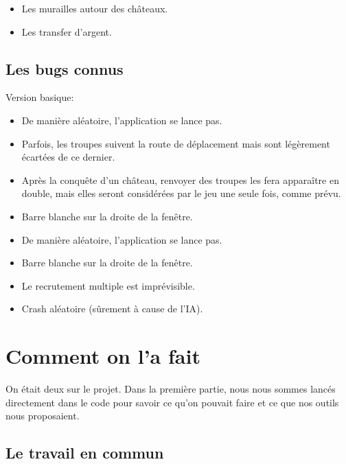 \documentclass[12pt, a4paper]{report}
\begin{document}

\begin{itemize}
    \item Les murailles autour des châteaux.
    \item Les transfer d'argent.
\end{itemize}

\subsection*{Les bugs connus}

Version basique:

\begin{itemize}
    \item De manière aléatoire, l'application se lance pas.
    \item Parfois, les troupes suivent la route de déplacement mais sont légèrement écartées de ce dernier.
    \item Après la conquête d'un château, renvoyer des troupes les fera apparaître en double, mais elles seront considérées par le jeu une seule fois, comme prévu.
    \item Barre blanche sur la droite de la fenêtre.
\end{itemize}


\begin{itemize}
    \item De manière aléatoire, l'application se lance pas.
    \item Barre blanche sur la droite de la fenêtre.
    \item Le recrutement multiple est imprévisible.
    \item Crash aléatoire (sûrement à cause de l'IA).
\end{itemize}

\section*{Comment on l'a fait}

On était deux sur le projet. Dans la première partie, nous nous sommes lancés directement dans le code pour savoir ce qu'on pouvait faire et ce que nos outils nous proposaient.

\subsection*{Le travail en commun}
\end{document}
